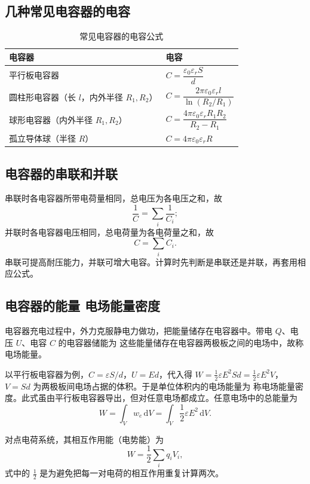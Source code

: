     \subsection{几种常见电容器的电容}
    \begin{table}[htbp]
    \centering
    \caption{常见电容器的电容公式}
    \begin{tabular}{ll}
    \toprule
    电容器 & 电容 \\
    \midrule
    平行板电容器 & $C=\dfrac{\varepsilon_0\varepsilon_rS}{d}$ \\
    圆柱形电容器（长 $l$，内外半径 $R_1,R_2$） & $C=\dfrac{2\pi\varepsilon_0\varepsilon_rl}{\ln(R_2/R_1)}$ \\
    球形电容器（内外半径 $R_1,R_2$） & $C=\dfrac{4\pi\varepsilon_0\varepsilon_rR_1R_2}{R_2-R_1}$ \\
    孤立导体球（半径 $R$） & $C=4\pi\varepsilon_0\varepsilon_rR$ \\
    \bottomrule
    \end{tabular}
    \end{table}

    \subsection{电容器的串联和并联}
    串联时各电容器所带电荷量相同，总电压为各电压之和，故
    \[
    \frac{1}{C}=\sum_i\frac{1}{C_i};
    \]
    并联时各电容器电压相同，总电荷量为各电荷量之和，故
    \[
    C=\sum_iC_i.
    \]
    串联可提高耐压能力，并联可增大电容。计算时先判断是串联还是并联，再套用相应公式。

    \subsection{电容器的能量 电场能量密度}
    电容器充电过程中，外力克服静电力做功，把能量储存在电容器中。带电 $Q$、电压 $U$、电容 $C$ 的电容器储能为
    这些能量储存在电容器两极板之间的电场中，故称电场能量。

    以平行板电容器为例，$C=\varepsilon S/d$，$U=Ed$，代入得 $W=\frac{1}{2}\varepsilon E^{2}Sd=\frac{1}{2}\varepsilon E^{2}V$，$V=Sd$ 为两极板间电场占据的体积。于是单位体积内的电场能量为
    称电场能量密度。此式虽由平行板电容器导出，但对任意电场都成立。任意电场中的总能量为
    \[
    W=\int_V w_e\,\mathrm{d}V=\int_V\frac{1}{2}\varepsilon E^{2}\,\mathrm{d}V.
    \]

    对点电荷系统，其相互作用能（电势能）为
    \[
    W=\frac{1}{2}\sum_i q_iV_i,
    \]
    式中的 $\frac{1}{2}$ 是为避免把每一对电荷的相互作用重复计算两次。

